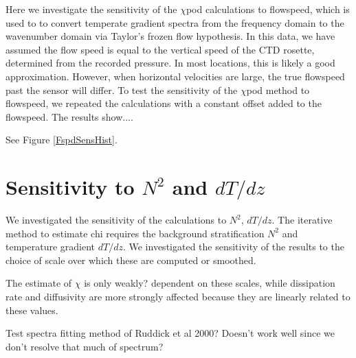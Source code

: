 \documentclass{ametsoc}
\begin{document}
\appendix[B]


Here we investigate the sensitivity of the $\chi$pod calculations to flowspeed, which is used to to convert temperate gradient spectra from the frequency domain to the wavenumber domain via Taylor's frozen flow hypothesis. In this data, we have assumed the flow speed is equal to the vertical speed of the CTD rosette, determined from the recorded pressure. In most locations, this is likely a good approximation. However, when horizontal velocities are large, the true flowspeed past the sensor will differ. To test the sensitivity of the $\chi$pod method to flowspeed, we repeated the calculations with a constant offset added to the flowspeed. The results show....

See Figure \ref{FspdSensHist}.

\section{Sensitivity to $N^2$ and $dT/dz$ }

We investigated the sensitivity of the calculations to $N^2$, $dT/dz$. 
The iterative method to estimate chi requires the background stratification $N^2$ and temperature gradient $dT/dz$. We investigated the sensitivity of the results to the choice of scale over which these are computed or smoothed.

The estimate of $\chi$ is only weakly? dependent on these scales, while dissipation rate and diffusivity are more strongly affected because they are linearly related to these values.


\appendix[C]

Test spectra fitting method of Ruddick et al 2000? Doesn't work well since we don't resolve that much of spectrum?



%


\end{document}

